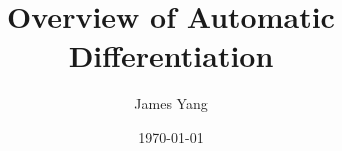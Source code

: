 \documentclass{beamer} %
\title{Overview of Automatic Differentiation}
\author{James Yang}
\date{\today}
\begin{document}
\begin{frame}
	\titlepage
\end{frame}

\begin{frame}
	\tableofcontents
\end{frame}







\end{document}
